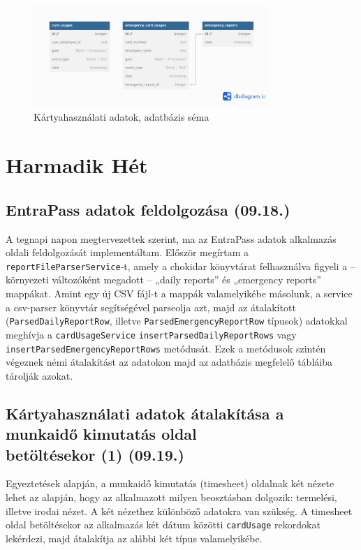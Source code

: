 \documentclass[a4paper]{article}
\newcommand{\inlts}[1]{\texttt{#1}}
\begin{document}
\begin{figure}[ht]
  \centering
  \includegraphics[clip, trim=0 50 0 0, width = 0.8\textwidth]{images/card_usages_schema.png}
  \caption{Kártyahasználati adatok, adatbázis séma}
  \label{fig:card_usages_schema}
\end{figure}


\section{Harmadik Hét}

\subsection{EntraPass adatok feldolgozása (09.18.)}

A tegnapi napon megtervezettek szerint, ma az EntraPass adatok alkalmazás oldali feldolgozását
implementáltam. Először megírtam a \inlts{reportFileParserService}-t, amely a chokidar könyvtárat
felhasználva figyeli a – környezeti változóként megadott – „daily reports” és „emergency reports”
mappákat. Amint egy új CSV fájl-t a mappák valamelyikébe másolunk, a service a csv-parser
könyvtár segítségével parseolja azt, majd az átalakított (\inlts{ParsedDailyReportRow}, illetve
\inlts{ParsedEmergencyReportRow} típusok) adatokkal meghívja a \inlts{cardUsageService}
\inlts{insertParsedDailyReportRows} vagy \inlts{insertParsedEmergencyReportRows} metódusát. Ezek
a metódusok szintén végeznek némi átalakítást az adatokon majd az adatbázis megfelelő tábláiba
tárolják azokat.

\subsection{Kártyahasználati adatok átalakítása a munkaidő kimutatás oldal\\ betöltésekor (1) (09.19.)}

Egyeztetések alapján, a munkaidő kimutatás (timesheet) oldalnak két nézete lehet az alapján, hogy az
alkalmazott milyen beosztásban dolgozik: termelési, illetve irodai nézet. A két nézethez különböző
adatokra van szükség. A timesheet oldal betöltésekor az alkalmazás két dátum közötti \inlts{cardUsage}
rekordokat lekérdezi, majd átalakítja az alábbi két típus valamelyikébe.
\end{document}
